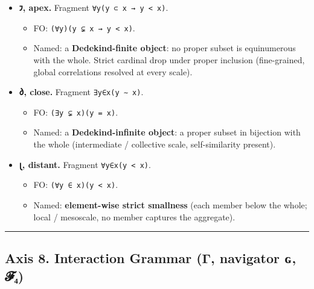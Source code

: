 \documentclass[12pt,a4paper]{article}
\begin{document}
\begin{itemize}
\tightlist
\item
  \textbf{𐑲, apex.} Fragment
  \texttt{∀y(y\ ⊂\ x\ →\ \textbar{}y\textbar{}\ \textless{}\ \textbar{}x\textbar{})}.

  \begin{itemize}
  \tightlist
  \item
    FO:
    \texttt{(∀y)(y\ ⊊\ x\ →\ \textbar{}y\textbar{}\ \textless{}\ \textbar{}x\textbar{})}.
  \item
    Named: a \textbf{Dedekind-finite object}: no proper subset is
    equinumerous with the whole. Strict cardinal drop under proper
    inclusion (fine-grained, global correlations resolved at every
    scale).
  \end{itemize}
\item
  \textbf{𐑔, close.} Fragment
  \texttt{∃y∈x(\textbar{}y\textbar{}\ ∼\ \textbar{}x\textbar{})}.

  \begin{itemize}
  \tightlist
  \item
    FO:
    \texttt{(∃y\ ⊊\ x)(\textbar{}y\textbar{}\ =\ \textbar{}x\textbar{})}.
  \item
    Named: a \textbf{Dedekind-infinite object}: a proper subset in
    bijection with the whole (intermediate / collective scale,
    self-similarity present).
  \end{itemize}
\item
  \textbf{𐑚, distant.} Fragment
  \texttt{∀y∈x(\textbar{}y\textbar{}\ \textless{}\ \textbar{}x\textbar{})}.

  \begin{itemize}
  \tightlist
  \item
    FO:
    \texttt{(∀y\ ∈\ x)(\textbar{}y\textbar{}\ \textless{}\ \textbar{}x\textbar{})}.
  \item
    Named: \textbf{element-wise strict smallness} (each member below the
    whole; local / mesoscale, no member captures the aggregate).
  \end{itemize}
\end{itemize}

\begin{center}\rule{0.5\linewidth}{0.5pt}\end{center}

\hypertarget{axis-8.-interaction-grammar-ux3b3-navigator-ux262-ux1d4d5ux2084}{%
\subsection{Axis 8. Interaction Grammar (Γ, navigator ɢ,
𝓕₄)}\label{axis-8.-interaction-grammar-ux3b3-navigator-ux262-ux1d4d5ux2084}}
\end{document}
